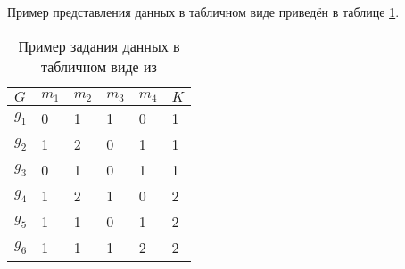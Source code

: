 	Пример представления данных в табличном виде приведён в таблице \ref{tab:ToyCompare-Peskov}.
	
	\begin{table} [htbp]%
		\centering
		\caption{Пример задания данных в табличном виде из \cite{Peskov2004}}%
		\label{tab:ToyCompare-Peskov}		\begin{SingleSpace}
			\begin{tabular}{|l|l|l|l|l|l|}
				\hline
				$G$&$m_1$&$m_2$&$m_3$&$m_4$&$K$\\
				\hline
				$g_1$&0&1&1&0&1\\
				$g_2$&1&2&0&1&1\\
				$g_3$&0&1&0&1&1\\
				$g_4$&1&2&1&0&2\\
				$g_5$&1&1&0&1&2\\
				$g_6$&1&1&1&2&2\\
				\hline		
			\end{tabular}	
		\end{SingleSpace}
	\end{table}
		